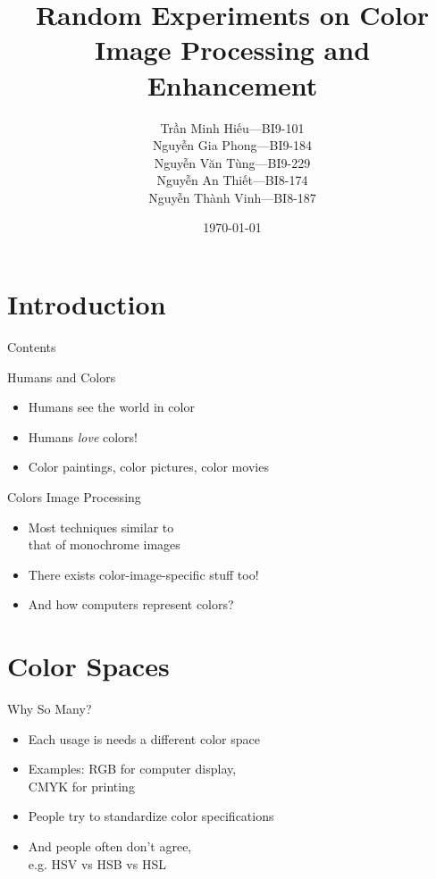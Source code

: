 \documentclass[pdf]{beamer}
\title[RECIPE]{Random Experiments on Color Image Processing and Enhancement}
\author[Group 8]{Trần Minh Hiếu---BI9-101\\
                 Nguyễn Gia Phong---BI9-184\\
                 Nguyễn Văn Tùng---BI9-229\\
                 Nguyễn An Thiết---BI8-174\\
                 Nguyễn Thành Vinh---BI8-187}
\institute{University of Science and Technology of Hà Nội}
\date{\selectlanguage{english}\today}
\begin{document}
\frame{\titlepage}
\section{Introduction}
\begin{frame}{Contents}
  \tableofcontents
\end{frame}
\begin{frame}{Humans and Colors}
  \begin{itemize}\Large
    \item Humans see the world in color
    \item Humans \emph{love} colors!
    \item Color paintings, color pictures, color movies
  \end{itemize}
\end{frame}

\begin{frame}{Colors Image Processing}\Large
  \begin{itemize}
    \item Most techniques similar to\\
      that of monochrome images
    \item There exists color-image-specific stuff too!
    \item And how computers represent colors?
  \end{itemize}
\end{frame}

\section{Color Spaces}
\frame{\tableofcontents[currentsection]}
\begin{frame}{Why So Many?}\Large
  \begin{itemize}
    \item Each usage is needs a different color space
    \item Examples: RGB for computer display,\\
      CMYK for printing
    \item People try to standardize color specifications
    \item And people often don't agree,\\
      e.g. HSV vs HSB vs HSL
  \end{itemize}
\end{frame}
\end{document}

